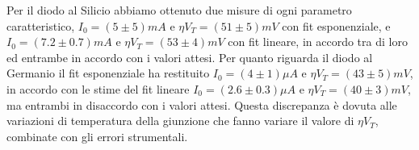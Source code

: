 \documentclass[]{article}
\begin{document}
Per il diodo al Silicio abbiamo ottenuto due misure di ogni parametro caratteristico, $I_0=(5\pm5)mA$ e $\eta V_T=(51\pm5)mV$ con fit esponenziale, e $I_0=(7.2\pm0.7)mA$ e $\eta V_T=(53\pm4)mV$ con fit lineare, in accordo tra di loro ed entrambe in accordo con i valori attesi. Per quanto riguarda il diodo al Germanio il fit esponenziale ha restituito $I_0=(4\pm1)\mu A$ e $\eta V_T=(43\pm5)mV$, in accordo con le stime del fit lineare $I_0=(2.6\pm0.3)\mu A$ e $\eta V_T=(40\pm3)mV$, ma entrambi in disaccordo con i valori attesi. Questa discrepanza è dovuta alle variazioni di temperatura della giunzione che fanno variare il valore di $\eta V_T$, combinate con gli errori strumentali.
\end{document}
